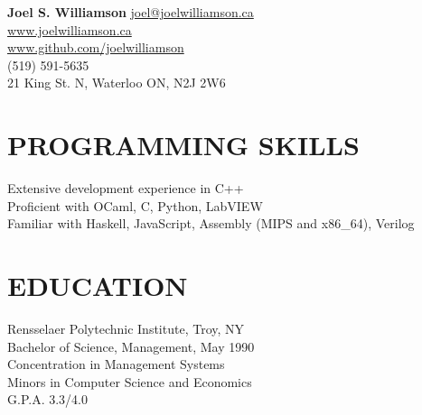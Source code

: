 \documentclass{res}
\begin{document}
 

\begin{center}
{\Large\bf Joel S. Williamson}
{\center \href{mailto:joel@joelwilliamson.ca}{joel@joelwilliamson.ca}\\\url{www.joelwilliamson.ca}\\\url{www.github.com/joelwilliamson}\\
(519) 591-5635\\21 King St. N, Waterloo ON, N2J 2W6 }
\end{center}
\vspace{-1cm}                 
\begin{resume}

\section{PROGRAMMING SKILLS}          
  \vspace{3mm}
    Extensive development experience in C++\\
    Proficient with OCaml, C, Python, LabVIEW\\
    Familiar with Haskell, JavaScript, Assembly (MIPS and x86\_64), Verilog 
 
\section{EDUCATION}          
    Rensselaer Polytechnic Institute, Troy, NY  \\        
    Bachelor of Science, Management, May 1990   \\       
    Concentration in Management Systems       \\   
    Minors in Computer Science and Economics  \\        
    G.P.A. 3.3/4.0          

 

\end{resume}
\end{document}
